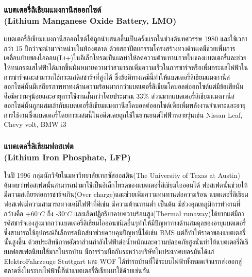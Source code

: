 \subsubsection*{แบตเตอรี่ลิเธียมแมงกานีสออกไซด์\\ (Lithium Manganese Oxide Battery, LMO)}
	แบตเตอรี่ลิเธียมแมงกานีสออกไซด์ได้ถูกนำเสนอขึ้นเป็นครั้งแรกในช่วงต้นทศวรรษ 1980 และใช้เวลากว่า 15 ปีกว่าจะนำมาจำหน่ายในท้องตลาด ด้วยสถาปัตยกรรมโครงสร้างทางด้านเคมีช่วยเพิ่มการเคลื่อนย้ายของไอออน(Li+)ในอิเล็กโทรดเป็นผลทำให้ลดความต้านทานภายในของแบตเตอรี่และช่วยให้ทนกระแสไฟฟ้าได้มากขึ้นนั่นหมายความว่าสามารถเพิ่มความเร็วในการชาร์จหรือเพิ่มกระแสไฟฟ้าในการชาร์จและสามารถใช้กระแสดิสชาร์จที่สูงได้ ซึ่งข้อดีทางเคมีนี้ทำให้แบตเตอรี่ลิเธียมแมงกานีสออกไซด์นั้นมีเสถียรภาพทาทงด้านความร้อนมากกว่าแบตเตอรี่ลิเธียมโคบอลต์ออกไซด์แต่มีข้อเสียนั่นคือมีความจุน้อยและอายุการใช้งานสั้นกว่าโดยประมาณ 33\% 
	\newline ส่วนมากแบตเตอรี่ลิเธียมแมงกานีสออกไซด์นั้นถูกผสมเข้ากับแบตเตอรี่ลิเธียมแมงกานีสโคบอลต์ออกไซด์เพื่อเพิ่มพลังงานจำเพาะและอายุการใช้งานซึ่งแบตเตอรี่โดยการผสมนี้ในอดีตเคยถูกใช้ในยานยนต์ไฟฟ้าหลายรุ่นเช่น Nissan Leaf, Chevy volt, BMW i3
\subsubsection*{แบตเตอรี่ลิเธียมฟอสเฟต\\ (Lithium Iron Phosphate, LFP)}
	ในปี 1996 กลุ่มนักวิจัยในมหาวิทยาลัยเทกซัสออสติน(The University of Texas at Austin) ค้นพบว่าฟอสเฟตนั้นสามารถนำมาใช้เป็นอิเล็กโทรดของแบตเตอรี่ลิเธียมไอออนได้ ฟอสเฟตนั้นช่วยให้มีความสเถียรต่อการชาร์จเกิน(Over charge)และช่วยเพิ่มความทนทานต่อความร้อน แบตเตอรี่ลิเธียมฟอสเฟตมีความสามารถทางเคมีไฟฟ้าที่ดีเช่น มีความต้านทานต่ำ เป็นต้น มีช่วงอุณหภูมิการทำงานที่กว้างคือ +60$^{\circ}C$ ถึง -30$^{\circ}C$ และเกิดปฏิกริยาคายความร้อนสูง(Thermal runaway)ได้ยากแต่มีการดิสชาร์จเองสูงมากกว่าแบตเตอรี่ลิเธียมไอออนชนิดอื่นๆทำให้มีปัญหาทางด้านสมดุลของอายุแบตเตอรี่ซึ่งสามารถใช้อุปกรณ์อิเล็กทรอนิกส์มาช่วยควบคุมปัญหานี้ได้เช่น BMS แต่ก็ทำให้ราคาของแบตเตอรี่นั้นสูงขึ้น
	\newline ด้วยประสิทธิภาพอัตราส่วนกำลังไฟฟ้าต่อน้ำหนักและความปลอดภัยสูงนั่นทำให้แบตเตอรี่ลิเธียมฟอสเฟตนิยมใช้มากในรถบ้าน มีการร่วมมือกันระหว่างบริษัทในประเทศเยอรมันได้แก่ ElektroFahrzeuge Stuttgart และ WOF ได้ทำรถบ้านที่ใช้ระบบไฟฟ้าทั้งหมดเจ้าแรกส่งออกสู่ตลาดซึ่งในระบบไฟฟ้านี้ก็นำแบตเตอรี่ลิเธียมมาใช้ด้วยเช่นกัน
